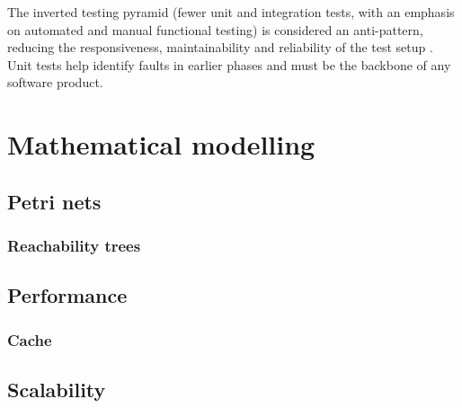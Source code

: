 \documentclass[11pt,english]{article} %
\begin{document}
The inverted testing pyramid (fewer unit and integration tests, with an emphasis on automated and manual functional testing) is considered an anti-pattern, reducing the responsiveness, maintainability and reliability of the test setup \cite{test-pyramid}. 
Unit tests help identify faults in earlier phases \cite{test-pyramid} and must be the backbone of any software product.


\newpage
\section{Mathematical modelling}

\subsection{Petri nets}
\subsubsection{Reachability trees}

\subsection{Performance}
\subsubsection{Cache}

\subsection{Scalability}

\newpage


\printbibliography
\end{document}
